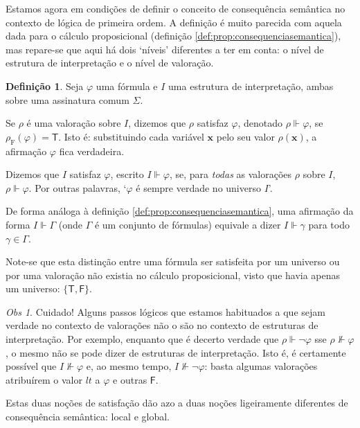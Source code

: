 \documentclass{report}
\theoremstyle{definition}
\newtheorem{definicao}{Definição}
\theoremstyle{remark}
\newtheorem{obs}{Obs}
\renewcommand{\bf}[1]{\mathbf{#1}}
\newcommand{\F}{\mathrm{F}}
\newcommand{\lt}{\mathsf{T}}
\newcommand{\lf}{\mathsf{F}}
\begin{document}
	Estamos agora em condições de definir o conceito de consequência semântica no contexto de lógica de primeira ordem. A definição é muito parecida com aquela dada para o cálculo proposicional (definição \ref{def:prop:consequenciasemantica}), mas repare-se que aqui há dois `níveis' diferentes a ter em conta: o nível de estrutura de interpretação e o nível de valoração.
	
	\begin{definicao}
	Seja $\varphi$ uma fórmula e $I$ uma estrutura de interpretação, ambas sobre uma assinatura comum $\Sigma$.
	
	Se $\rho$ é uma valoração sobre $I$, dizemos que $\rho$ satisfaz $\varphi$, denotado $\rho \Vdash \varphi$, se $\rho_\F(\varphi) = \lt$. Isto é: substituindo cada variável $\bf x$ pelo seu valor $\rho(\bf x)$, a afirmação $\varphi$ fica verdadeira.
	
	Dizemos que $I$ satisfaz $\varphi$, escrito $I \Vdash \varphi$, se, para \emph{todas} as valorações $\rho$ sobre $I$, $\rho \Vdash \varphi$. Por outras palavras, `$\varphi$ é sempre verdade no universo $I$'.
	
	De forma análoga à definição \ref{def:prop:consequenciasemantica}, uma afirmação da forma $I \Vdash \Gamma$ (onde $\Gamma$ é um conjunto de fórmulas) equivale a dizer $I \Vdash \gamma$ para todo $\gamma \in \Gamma$.
	\end{definicao}
	
	Note-se que esta distinção entre uma fórmula ser satisfeita por um universo ou por uma valoração não existia no cálculo proposicional, visto que havia apenas um universo: $\{\lt, \lf\}$.
	
	\begin{obs}\label{structuresatisfactionnotnice}
	Cuidado! Alguns passos lógicos que estamos habituados a que sejam verdade no contexto de valorações não o são no contexto de estruturas de interpretação. Por exemplo, enquanto que é decerto verdade que $\rho \Vdash \neg \varphi$ sse $\rho \nVdash \varphi$, o mesmo não se pode dizer de estruturas de interpretação. Isto é, é certamente possível que $I \nVdash \varphi$ e, ao mesmo tempo, $I \nVdash \neg \varphi$: basta algumas valorações atribuírem o valor $lt$ a $\varphi$ e outras $\lf$.
	\end{obs}
	
	Estas duas noções de satisfação dão azo a duas noções ligeiramente diferentes de consequência semântica: local e global.
	
\end{document}
